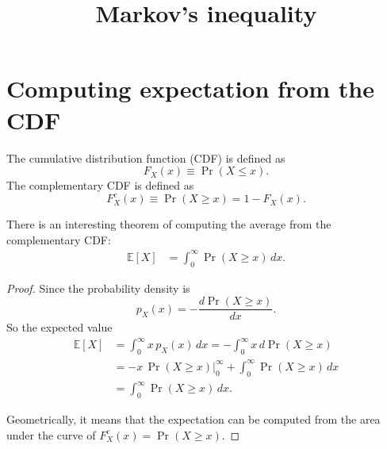 \documentclass{article}
\begin{document}
\title{Markov's inequality}
\author{ \vspace{-10ex} }
\date{ \vspace{-10ex} }
\maketitle

\section{Computing expectation from the CDF}

The cumulative distribution function (CDF) is defined as
$$
F_X(x) \equiv \operatorname{Pr}(X \le x).
$$
The complementary CDF is defined as
$$
F^c_X(x) \equiv \operatorname{Pr}(X \ge x) = 1 - F_X(x).
$$

There is an interesting theorem of computing the average
from the complementary CDF:
\begin{align}
\mathbb{E}[X] &= \int_0^\infty \operatorname{Pr}(X \ge x) \, dx.
\label{eq:avccdf}
\end{align}

\begin{proof}
Since the probability density is
$$
p_X(x) = - \frac{ d \operatorname{Pr}(X\ge x) }{ d x }.
$$
So the expected value
$$
\begin{aligned}
\mathbb{E}[X] &= \int_0^\infty x \, p_X(x) \, dx
 = -\int_0^\infty x \, d \operatorname{Pr}(X \ge x) \\
 &= -x \, \operatorname{Pr}(X\ge x) \Bigr|_0^\infty
  + \int_0^\infty \operatorname{Pr}(X \ge x) \, dx \\
 &= \int_0^\infty \operatorname{Pr}(X \ge x) \, dx.
\end{aligned}
$$
\begin{figure}[h]
  \centering
\end{figure}
Geometrically, it means that the expectation can be computed from
the area under the curve of $F^c_X(x) = \operatorname{Pr}(X \ge x)$.
\end{proof}
\end{document}
